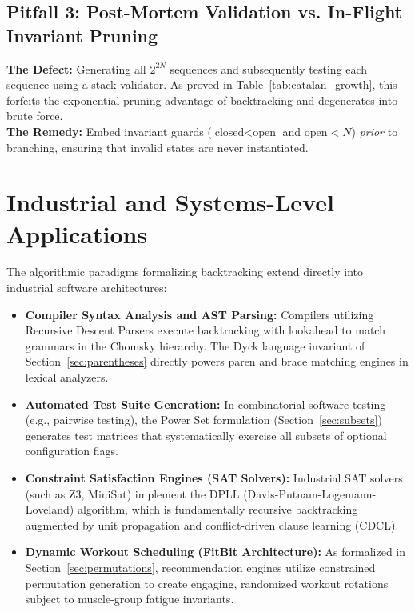 \documentclass[10pt,journal,compsoc,onecolumn]{IEEEtran}
\begin{document}
\subsection{Pitfall 3: Post-Mortem Validation vs. In-Flight Invariant Pruning}
\textbf{The Defect:} Generating all $2^{2N}$ sequences and subsequently testing each sequence using a stack validator. As proved in Table~\ref{tab:catalan_growth}, this forfeits the exponential pruning advantage of backtracking and degenerates into brute force.\\
\textbf{The Remedy:} Embed invariant guards ($\text{closed} < \text{open}$ and $\text{open} < N$) \textit{prior} to branching, ensuring that invalid states are never instantiated.

\section{Industrial and Systems-Level Applications}
\label{sec:industrial}

The algorithmic paradigms formalizing backtracking extend directly into industrial software architectures:
\begin{itemize}
    \item \textbf{Compiler Syntax Analysis and AST Parsing:} Compilers utilizing Recursive Descent Parsers execute backtracking with lookahead to match grammars in the Chomsky hierarchy. The Dyck language invariant of Section~\ref{sec:parentheses} directly powers paren and brace matching engines in lexical analyzers.
    \item \textbf{Automated Test Suite Generation:} In combinatorial software testing (e.g., pairwise testing), the Power Set formulation (Section~\ref{sec:subsets}) generates test matrices that systematically exercise all subsets of optional configuration flags.
    \item \textbf{Constraint Satisfaction Engines (SAT Solvers):} Industrial SAT solvers (such as Z3, MiniSat) implement the DPLL (Davis-Putnam-Logemann-Loveland) algorithm, which is fundamentally recursive backtracking augmented by unit propagation and conflict-driven clause learning (CDCL).
    \item \textbf{Dynamic Workout Scheduling (FitBit Architecture):} As formalized in Section~\ref{sec:permutations}, recommendation engines utilize constrained permutation generation to create engaging, randomized workout rotations subject to muscle-group fatigue invariants.
\end{itemize}
\end{document}
